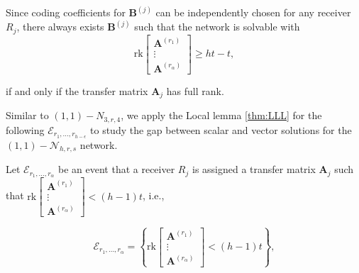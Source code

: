 Since coding coefficients for $\boldsymbol{B}^{\left(j\right)}$ can
be independently chosen for any receiver $R_{j}$, there always exists
$\boldsymbol{B}^{\left(j\right)}$ such that the network is solvable
with 
\[
\mathrm{rk}\left[\begin{array}{c}
\boldsymbol{A}^{\left(r_{1}\right)}\\
\vdots\\
\boldsymbol{A}^{\left(r_{\alpha}\right)}
\end{array}\right]\geq ht-t,
\]

if and only if the transfer matrix $\boldsymbol{A}_{j}$ has full
rank.

Similar to $\left(1,1\right)-\ensuremath{N}_{3,r,4}$, we apply the
Local lemma \ref{thm:LLL} for the following $\mathcal{E}_{r_{1},\ldots,r_{h-\epsilon}}$
to study the gap between scalar and vector solutions for the $\left(1,1\right)-\mathcal{N}_{h,r,s}$
network.

Let $\mathcal{E}_{r_{1},\ldots,r_{\alpha}}$ be an event that a receiver
$R_{j}$ is assigned a transfer matrix $\boldsymbol{A}_{j}$ such
that $\mathrm{rk}\left[\begin{array}{c}
\boldsymbol{A}^{\left(r_{1}\right)}\\
\vdots\\
\boldsymbol{A}^{\left(r_{\alpha}\right)}
\end{array}\right]<(h-1)t$, i.e.,

\[
\mathcal{E}_{r_{1},\ldots,r_{\alpha}}=\left\{ \mathrm{rk}\left[\begin{array}{c}
\boldsymbol{A}^{\left(r_{1}\right)}\\
\vdots\\
\boldsymbol{A}^{\left(r_{\alpha}\right)}
\end{array}\right]<(h-1)t\right\} ,
\]

